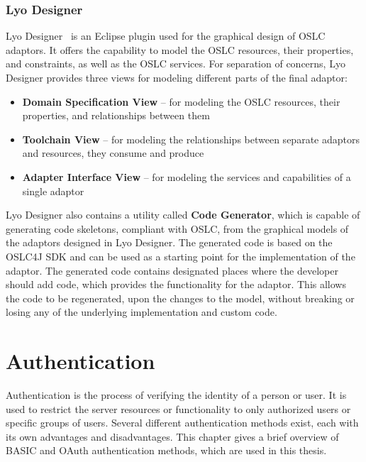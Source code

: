 \subsection*{Lyo Designer}
Lyo Designer \cite{lyo_designer} is an Eclipse plugin used for the graphical design of OSLC adaptors. It offers the capability to model the OSLC resources, their properties, and constraints, as well as the OSLC services. For separation of concerns, Lyo Designer provides three views for modeling different parts of the final adaptor:

\begin{itemize}
  \item \textbf{Domain Specification View} -- for modeling the OSLC resources, their properties, and relationships between them
  \item \textbf{Toolchain View} -- for modeling the relationships between separate adaptors and resources, they consume and produce
  \item \textbf{Adapter Interface View} -- for modeling the services and capabilities of a single adaptor
\end{itemize}

Lyo Designer also contains a utility called \textbf{Code Generator}, which is capable of generating code skeletons, compliant with OSLC, from the graphical models of the adaptors designed in Lyo Designer. The generated code is based on the OSLC4J SDK and can be used as a starting point for the implementation of the adaptor. The generated code contains designated places where the developer should add code, which provides the functionality for the adaptor. This allows the code to be regenerated, upon the changes to the model, without breaking or losing any of the underlying implementation and custom code.


\chapter{Authentication}
\label{chapter:authentication}
Authentication is the process of verifying the identity of a person or user. It is used to restrict the server resources or functionality to only authorized users or specific groups of users. Several different authentication methods exist, each with its own advantages and disadvantages. This chapter gives a brief overview of BASIC and OAuth authentication methods, which are used in this thesis.

